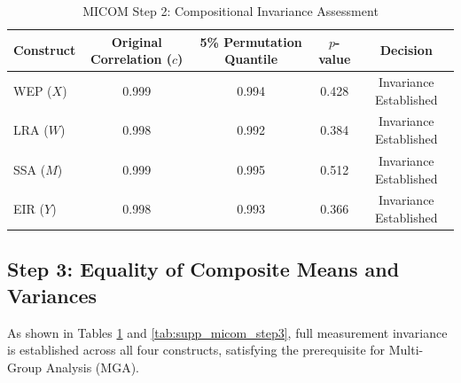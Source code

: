 \documentclass[11pt,a4paper]{article}
\begin{document}
\begin{table}[htbp]
\centering
\small
\caption{MICOM Step 2: Compositional Invariance Assessment}
\label{tab:supp_micom_step2}
\begin{tabular}{lcccc}
\toprule
\textbf{Construct} & \textbf{Original Correlation ($c$)} & \textbf{5\% Permutation Quantile} & \textbf{$p$-value} & \textbf{Decision} \\
\midrule
WEP ($X$) & 0.999 & 0.994 & 0.428 & Invariance Established \\
LRA ($W$) & 0.998 & 0.992 & 0.384 & Invariance Established \\
SSA ($M$) & 0.999 & 0.995 & 0.512 & Invariance Established \\
EIR ($Y$) & 0.998 & 0.993 & 0.366 & Invariance Established \\
\bottomrule
\end{tabular}
\end{table}

\subsection{Step 3: Equality of Composite Means and Variances}

\begin{table}[htbp]
\centering
\small
\caption{MICOM Step 3: Mean and Variance Invariance Assessment}
\label{tab:supp_micom_step3}
\end{table}

As shown in Tables \ref{tab:supp_micom_step2} and \ref{tab:supp_micom_step3}, full measurement invariance is established across all four constructs, satisfying the prerequisite for Multi-Group Analysis (MGA).
\end{document}
